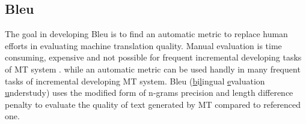 \subsection{Bleu}
The goal in developing Bleu is to find an automatic metric to replace human efforts in evaluating machine translation quality. Manual evaluation is time consuming, expensive and not possible for frequent incremental developing tasks of MT system \cite{Papineni2002}. while an automatic metric can be used handly in many frequent tasks of incremental developing MT system. 
Bleu (\underline{b}i\underline{l}ingual \underline{e}valuation \underline{u}nderstudy) uses the modified form of n-grams precision and length difference penalty to evaluate the quality of text generated by MT compared to referenced one.
